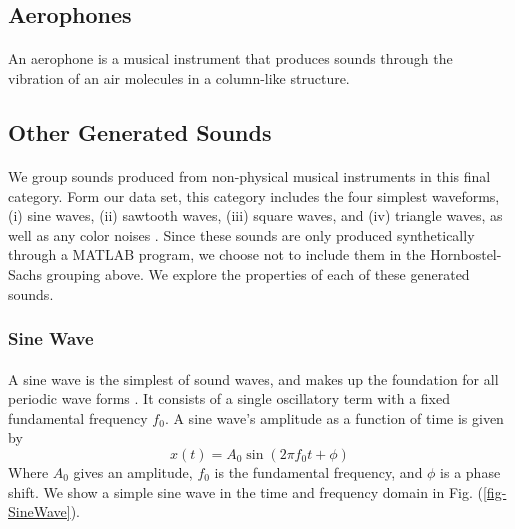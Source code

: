 \documentclass[12pt,letterpaper]{article}
\begin{document}

\subsection{Aerophones}
\label{subsec-Aerophones}

\paragraph*{}An aerophone is a musical instrument that produces sounds through the vibration of an air molecules in a column-like structure.


\subsection{Other Generated Sounds}
\label{subsec-Generated}

\paragraph*{}We group sounds produced from non-physical musical instruments in this final category. Form our data set, this category includes the four simplest waveforms, (i) sine waves, (ii) sawtooth waves, (iii) square waves, and (iv) triangle waves, as well as any color noises \cite{White}. Since these sounds are only produced synthetically through a MATLAB program, we choose not to include them in the Hornbostel-Sachs grouping above. We explore the properties of each of these generated sounds.


\subsubsection{Sine Wave}

\paragraph*{}A sine wave is the simplest of sound waves, and makes up the foundation for all periodic wave forms \cite{White,Virtanen}. It consists of a single oscillatory term with a fixed fundamental frequency $f_0$. A sine wave's amplitude as a function of time is given by 
\begin{equation}
\label{eqn-SineWave}
x(t) = A_0 \sin(2\pi f_0 t + \phi)
\end{equation}
Where $A_0$ gives an amplitude, $f_0$ is the fundamental frequency, and $\phi$ is a phase shift. We show a simple sine wave in the time and frequency domain in Fig. (\ref{fig-SineWave}).
\end{document}
